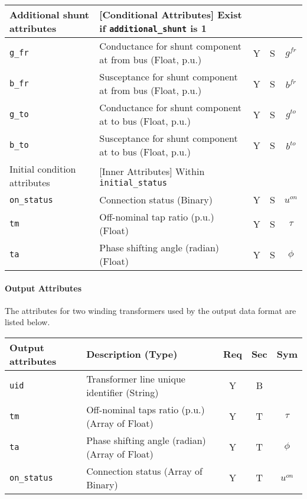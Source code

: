 \documentclass{article}
\begin{document}
\begin{center}
\small
\begin{tabular}{ l | l | c | c | c |}
  Additional shunt attributes & [Conditional Attributes] Exist if {\tt additional\_shunt} is 1 &  & & \\
  \hline
  {\tt g\_fr} & Conductance for shunt component at from bus (Float, p.u.)& Y & S & $g^{fr}$\\
  {\tt b\_fr} & Susceptance for shunt component at from bus (Float, p.u.)& Y & S & $b^{fr}$\\
  {\tt g\_to} & Conductance for shunt component at to bus (Float, p.u.)& Y & S & $g^{to}$\\
  {\tt b\_to} & Susceptance for shunt component at to bus (Float, p.u.)& Y & S & $b^{to}$\\
  \hline
  Initial condition attributes & [Inner Attributes] Within {\tt initial\_status} & & & \\
  \hline
  {\tt on\_status} & Connection status (Binary) & Y & S & $u^{on}$ \\
  {\tt tm} & Off-nominal tap ratio (p.u.) (Float)& Y & S & $\tau$\\
  {\tt ta} & Phase shifting angle (radian) (Float)& Y & S & $\phi$\\
  \hline
\end{tabular}
\end{center}


\paragraph{Output Attributes}
The attributes for two winding transformers used by the output data format are listed below.
\begin{center}
\small
\begin{tabular}{ l | l | c | c | c |}
Output attributes & Description (Type)& Req & Sec & Sym\\
\hline
 {\tt uid} & Transformer line unique identifier (String)& Y & B & \\
 {\tt tm} & Off-nominal taps ratio (p.u.) (Array of Float)& Y & T & $\tau$\\
 {\tt ta} & Phase shifting angle (radian) (Array of Float)& Y & T & $\phi$\\
 {\tt on\_status}     & Connection status (Array of Binary) & Y & T & $u^{on}$ \\
\hline
\end{tabular}
\end{center}
\end{document}
